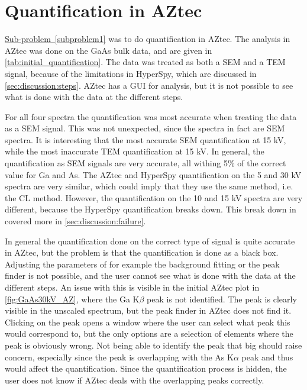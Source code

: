 \section{Quantification in AZtec}
\label{sec:discussion:az_quantification}

\hyperref[subproblem1]{Sub-problem~\ref*{subproblem1}} was to do quantification in AZtec.
The analysis in AZtec was done on the GaAs bulk data, and are given in \cref{tab:initial_quantification}.
The data was treated as both a SEM and a TEM signal, because of the limitations in HyperSpy, which are discussed in \cref{sec:discussion:steps}.
AZtec has a GUI for analysis, but it is not possible to see what is done with the data at the different steps.

For all four spectra the quantification was most accurate when treating the data as a SEM signal.
This was not unexpected, since the spectra in fact are SEM spectra.
It is interesting that the most accurate SEM quantification at 15 kV, while the most inaccurate TEM quantification at 15 kV.
In general, the quantification as SEM signals are very accurate, all withing 5\% of the correct value for Ga and As.
The AZtec and HyperSpy quantification on the 5 and 30 kV spectra are very similar, which could imply that they use the same method, i.e. the CL method.
However, the quantification on the 10 and 15 kV spectra are very different, because the HyperSpy quantification breaks down.
This break down in covered more in \cref{sec:discussion:failure}.

In general the quantification done on the correct type of signal is quite accurate in AZtec, but the problem is that the quantification is done as a black box.
Adjusting the parameters of for example the background fitting or the peak finder is not possible, and the user cannot see what is done with the data at the different steps.
An issue with this is visible in the initial AZtec plot in \cref{fig:GaAs30kV_AZ}, where the Ga K$\beta$ peak is not identified.
The peak is clearly visible in the unscaled spectrum, but the peak finder in AZtec does not find it.
Clicking on the peak opens a window where the user can select what peak this would correspond to, but the only options are a selection of elements where the peak is obviously wrong.
Not being able to identify the peak that big should raise concern, especially since the peak is overlapping with the As K$\alpha$ peak and thus would affect the quantification.
Since the quantification process is hidden, the user does not know if AZtec deals with the overlapping peaks correctly.









